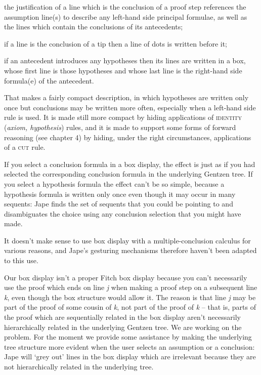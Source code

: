 \documentclass[11pt]{book}
\newcommand{\tab}{\hspace{5mm}}
\begin{document}
{\textbullet}\tab the justification of a line which is the conclusion of a proof step references the assumption line(s) to describe any left-hand side principal formulae, as well as the lines which contain the conclusions of its antecedents;


{\textbullet}\tab if a line is the conclusion of a tip then a line of dots is written before it;


{\textbullet}\tab if an antecedent introduces any hypotheses then its lines are written in a box, whose first line is those hypotheses and whose last line is the right-hand side formula(e) of the antecedent.


That makes a fairly compact description, in which hypotheses are written only once but conclusions may be written more often, especially when a left-hand side rule is used. It is made still more compact by hiding applications of \textsc{identity} (\textit{axiom, hypothesis}) rules, and it is made to support some forms of forward reasoning (see chapter 4) by hiding, under the right circumstances, applications of a \textsc{cut} rule.


If you select a conclusion formula in a box display, the effect is just as if you had selected the corresponding conclusion formula in the underlying Gentzen tree. If you select a hypothesis formula the effect can't be so simple, because a hypothesis formula is written only once even though it may occur in many sequents: Jape finds the set of sequents that you could be pointing to and disambiguates the choice using any conclusion selection that you might have made.


It doesn't make sense to use box display with a multiple-conclusion calculus for various reasons, and Jape's gesturing mechanisms therefore haven't been adapted to this use.


Our box display isn't a proper Fitch box display because you can't necessarily use the proof which ends on line \textit{j} when making a proof step on a subsequent line \textit{k}, even though the box structure would allow it. The reason is that line \textit{j} may be part of the proof of some cousin of \textit{k}, not part of the proof of \textit{k} -- that is, parts of the proof which are sequentially related in the box display aren't necessarily hierarchically related in the underlying Gentzen tree. We are working on the problem. For the moment we provide some assistance by making the underlying tree structure more evident when the user selects an assumption or a conclusion: Jape will `grey out' lines in the box display which are irrelevant because they are not hierarchically related in the underlying tree.
\end{document}
